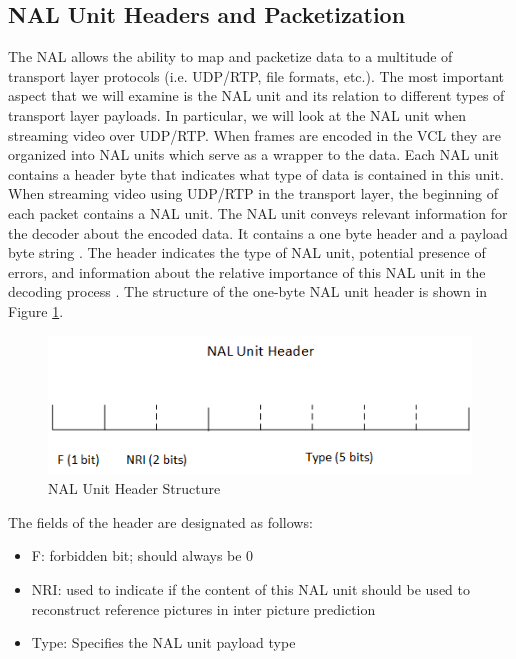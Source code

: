 \documentclass[a4paper,12pt]{article}
\begin{document}
\subsection{NAL Unit Headers and Packetization}
\label{sec:NALandPacketization}

The NAL allows the ability to map and packetize data to a multitude of transport layer protocols (i.e. UDP/RTP, file formats, etc.). The most important aspect that we will examine is the NAL unit and its relation to different types of transport layer payloads. In particular, we will look at the NAL unit when streaming video over UDP/RTP. When frames are encoded in the VCL they are organized into NAL units which serve as a wrapper to the data. Each NAL unit contains a header byte that indicates what type of data is contained in this unit. When streaming video using UDP/RTP in the transport layer, the beginning of each packet contains a NAL unit. The NAL unit conveys relevant information for the decoder about the encoded data. It contains a one byte header and a payload byte string \cite{RTP}. The header indicates the type of NAL unit, potential presence of errors, and information about the relative importance of this NAL unit in the decoding process \cite{RTP}. The structure of the one-byte NAL unit header is shown in Figure \ref{fig:NALHeaderStructure}.
\begin{figure}[h]
\centering
\includegraphics[width=0.7\linewidth]{NALUnitHeader.png}
\caption{NAL Unit Header Structure}
\label{fig:NALHeaderStructure}
\end{figure}
The fields of the header are designated as follows:
\begin{itemize}
\item F: forbidden bit; should always be 0
\item NRI: used to indicate if the content of this NAL unit should be used to reconstruct reference pictures in inter picture prediction
\item Type: Specifies the NAL unit payload type
\end{itemize}
\end{document}
